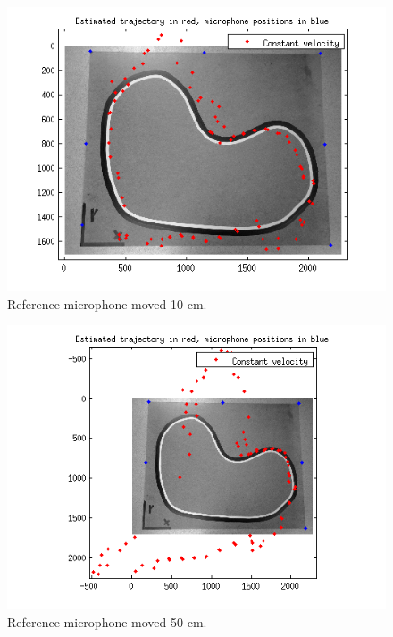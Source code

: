 \documentclass[10pt,a4paper]{report}
\begin{document}
\begin{figure}[H]
\begin{center}
  \includegraphics[width = 350pt]{sens_ref10.png}
  \caption{Reference microphone moved 10 cm.}
  \label{ref_10}
  \end{center}
\end{figure}
\begin{figure}[H]
\begin{center}
  \includegraphics[width = 350pt]{sens_ref50.png}
  \caption{Reference microphone moved 50 cm.}
  \label{ref_50}
  \end{center}
\end{figure}
\end{document}
